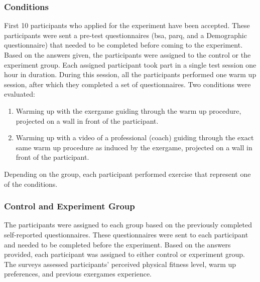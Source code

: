 \subsubsection{Conditions}
First 10 participants who applied for the experiment have been accepted. These participants were sent a pre-test questionnaires (\acrshort{bsa}, \acrshort{parq}, and a Demographic questionnaire) that needed to be completed before coming to the experiment. Based on the answers given, the participants were assigned to the control or the experiment group. Each assigned participant took part in a single test session one hour in duration. During this session, all the participants  performed one warm up session, after which they completed a set of questionnaires. Two conditions were evaluated:
\begin{enumerate}
\item Warming up with the exergame guiding through the warm up procedure, projected on a wall in front of the participant.
\item Warming up with a video of a professional (coach) guiding through the exact same warm up procedure as induced by the exergame, projected on a wall in front of the participant.
\end{enumerate}
Depending on the group, each participant performed exercise that represent one of the conditions.
\subsubsection{Control and Experiment Group}
The participants were assigned to each group based on the previously completed self-reported questionnaires. These questionnaires were sent to each participant and needed to be completed before the experiment. Based on the answers provided, each participant was assigned to either control or experiment group. The surveys assessed participants' perceived physical fitness level, warm up preferences, and previous exergames experience.
